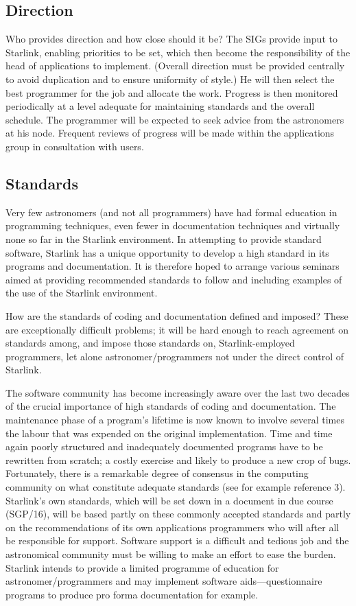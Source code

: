 \subsection {Direction}
Who provides direction and how close should it be?
The SIGs provide input to Starlink, enabling priorities to be set, which then
become the responsibility of the head of applications to implement.
(Overall direction must be provided centrally to avoid duplication and to
ensure uniformity of style.)
He will then select the best programmer for the job and allocate the work.
Progress is then monitored periodically at a level adequate for maintaining
standards and the overall schedule.
The programmer will be expected to seek advice from the astronomers at his node.
Frequent reviews of progress will be made within the applications group in
consultation with users.
\subsection {Standards}
Very few astronomers (and not all programmers) have had formal education in
programming techniques, even fewer in documentation techniques and virtually
none so far in the Starlink environment.
In attempting to provide standard software, Starlink has a unique opportunity to
develop a high standard in its programs and documentation.
It is therefore hoped to arrange various seminars aimed at providing recommended
standards to follow and including examples of the use of the Starlink
environment.

How are the standards of coding and documentation defined and imposed?
These are exceptionally difficult problems; it will be hard enough to reach
agreement on standards among, and impose those standards on, Starlink-employed
programmers, let alone astronomer/programmers not under the direct control of
Starlink.

The software community has become increasingly aware over the last two decades
of the crucial importance of high standards of coding and documentation.
The maintenance phase of a program's lifetime is now known to involve several
times the labour that was expended on the original implementation.
Time and time again poorly structured and inadequately documented programs have
to be rewritten from scratch; a costly exercise and likely to produce a new
crop of bugs.
Fortunately, there is a remarkable degree of consensus in the computing
community on what constitute adequate standards (see for example reference 3).
Starlink's own standards, which will be set down in a document in due course
(SGP/16), will be based partly on these commonly accepted standards and partly
on the recommendations of its own applications programmers who will after all
be responsible for support.
Software support is a difficult and tedious job and the astronomical community
must be willing to make an effort to ease the burden.
Starlink intends to provide a limited programme of education for
astronomer/programmers and may implement software aids---questionnaire
programs to produce pro forma documentation for example.

